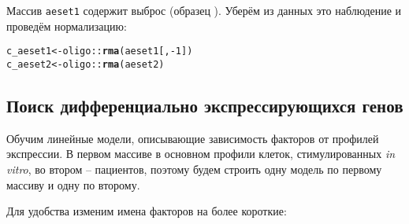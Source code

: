 \documentclass{article}
\makeatletter
\newcommand{\hlnum}[1]{\textcolor[rgb]{0.686,0.059,0.569}{#1}}%
\newcommand{\hlopt}[1]{\textcolor[rgb]{0,0,0}{#1}}%
\newcommand{\hlstd}[1]{\textcolor[rgb]{0.345,0.345,0.345}{#1}}%
\newcommand{\hlkwb}[1]{\textcolor[rgb]{0.69,0.353,0.396}{#1}}%
\newcommand{\hlkwd}[1]{\textcolor[rgb]{0.737,0.353,0.396}{\textbf{#1}}}%
\newenvironment{kframe}{%
 \def\at@end@of@kframe{}%
 \ifinner\ifhmode%
  \def\at@end@of@kframe{\end{minipage}}%
  \begin{minipage}{\columnwidth}%
 \fi\fi%
 \def\FrameCommand##1{\hskip\@totalleftmargin \hskip-\fboxsep
 \colorbox{shadecolor}{##1}\hskip-\fboxsep
     \hskip-\linewidth \hskip-\@totalleftmargin \hskip\columnwidth}%
 \MakeFramed {\advance\hsize-\width
   \@totalleftmargin\z@ \linewidth\hsize
   \@setminipage}}%
 {\par\unskip\endMakeFramed%
 \at@end@of@kframe}
\newenvironment{knitrout}{}{} %
\makeatother
\begin{document}
Массив \texttt{aeset1} содержит выброс (образец  ).
Уберём из данных это наблюдение и проведём нормализацию:

\begin{knitrout}
\color{fgcolor}\begin{kframe}
\begin{alltt}
\hlstd{c_aeset1} \hlkwb{<-} \hlstd{oligo}\hlopt{::}\hlkwd{rma}\hlstd{(aeset1[,} \hlopt{-}\hlnum{1}\hlstd{])}
\hlstd{c_aeset2} \hlkwb{<-} \hlstd{oligo}\hlopt{::}\hlkwd{rma}\hlstd{(aeset2)}
\end{alltt}
\end{kframe}
\end{knitrout}

\subsection{Поиск дифференциально экспрессирующихся генов}

Обучим линейные модели, описывающие зависимость факторов от профилей экспрессии.
В первом массиве в основном профили клеток, стимулированных \textit{in vitro}, во втором -- пациентов, поэтому будем строить одну модель по первому массиву и одну по второму.

Для удобства изменим имена факторов на более короткие:
\end{document}
